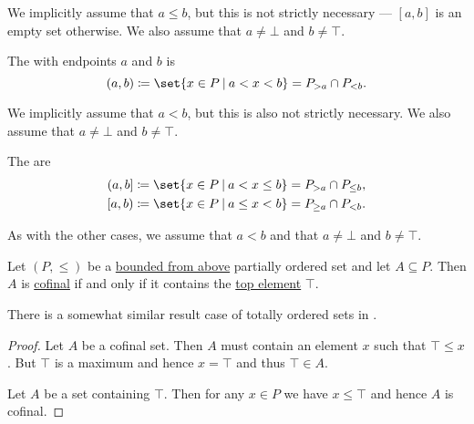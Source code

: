 \begin{definition}
\begin{thmenum}
    We implicitly assume that \( a \leq b \), but this is not strictly necessary --- \( [a, b] \) is an empty set otherwise. We also assume that \( a \neq \bot \) and \( b \neq \top \).

     The  with endpoints \( a \) and \( b \) is
    \begin{equation*}
      (a, b) \coloneqq \set{ x \in P \given a < x < b } = P_{> a} \cap P_{< b}.
    \end{equation*}

    We implicitly assume that \( a < b \), but this is also not strictly necessary. We also assume that \( a \neq \bot \) and \( b \neq \top \).

     The  are
    \begin{equation*}
      \begin{aligned}
        (a, b] \coloneqq \set{ x \in P \given a < x \leq b } = P_{> a} \cap P_{\leq b},
        \\
        [a, b) \coloneqq \set{ x \in P \given a \leq x < b } = P_{\geq a} \cap P_{< b}.
      \end{aligned}
    \end{equation*}

    As with the other cases, we assume that \( a < b \) and that \( a \neq \bot \) and \( b \neq \top \).
  \end{thmenum}
\end{definition}

\begin{proposition}\label{thm:partially_ordered_cofinal_equivalences}
  Let \( (P, \leq) \) be a \hyperref[def:extremal_points/upper_and_lower_bounds]{bounded from above} partially ordered set and let \( A \subseteq P \). Then \( A \) is \hyperref[def:cofinal_set]{cofinal} if and only if it contains the \hyperref[def:extremal_points/top_and_bottom]{top element} \( \top \).
\end{proposition}
\begin{comments}
  \item There is a somewhat similar result case of totally ordered sets in .
\end{comments}
\begin{proof}
  \SufficiencySubProof Let \( A \) be a cofinal set. Then \( A \) must contain an element \( x \) such that \( \top \leq x \). But \( \top \) is a maximum and hence \( x = \top \) and thus \( \top \in A \).

  \NecessitySubProof Let \( A \) be a set containing \( \top \). Then for any \( x \in P \) we have \( x \leq \top \) and hence \( A \) is cofinal.
\end{proof}


